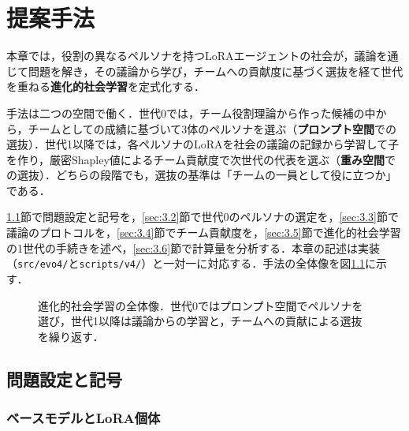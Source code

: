 

\chapter{提案手法}
\label{cha:3}

本章では，役割の異なるペルソナを持つLoRAエージェントの社会が，議論を通じて問題を解き，その議論から学び，チームへの貢献度に基づく選抜を経て世代を重ねる\textbf{進化的社会学習}を定式化する．

手法は二つの空間で働く．世代0では，チーム役割理論から作った候補の中から，チームとしての成績に基づいて3体のペルソナを選ぶ（\textbf{プロンプト空間}での選抜）．世代1以降では，各ペルソナのLoRAを社会の議論の記録から学習して子を作り，厳密Shapley値によるチーム貢献度で次世代の代表を選ぶ（\textbf{重み空間}での選抜）．どちらの段階でも，選抜の基準は「チームの一員として役に立つか」である．

\ref{sec:3.1}節で問題設定と記号を，\ref{sec:3.2}節で世代0のペルソナの選定を，\ref{sec:3.3}節で議論のプロトコルを，\ref{sec:3.4}節でチーム貢献度を，\ref{sec:3.5}節で進化的社会学習の1世代の手続きを述べ，\ref{sec:3.6}節で計算量を分析する．本章の記述は実装（\texttt{src/evo4/}と\texttt{scripts/v4/}）と一対一に対応する．手法の全体像を図\ref{fig:3.1}に示す．

\begin{figure}[htbp]
\centering
\resizebox{\textwidth}{!}{}
\caption{進化的社会学習の全体像．世代0ではプロンプト空間でペルソナを選び，世代1以降は議論からの学習と，チームへの貢献による選抜を繰り返す．}
\label{fig:3.1}
\end{figure}

\section{問題設定と記号}
\label{sec:3.1}

\subsection{ベースモデルとLoRA個体}
\label{sec:3.1.1}

